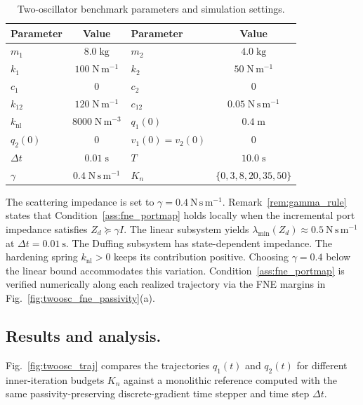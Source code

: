 \begin{table}[!t]
  \caption{Two-oscillator benchmark parameters and simulation settings.}
  \label{tab:twoosc_params}
  \centering
  \renewcommand{\arraystretch}{1.1}
  \begin{tabular}{l c l c}
    \hline
    Parameter & Value & Parameter & Value \\
    \hline
    $m_1$ & $8.0\;\mathrm{kg}$ & $m_2$ & $4.0\;\mathrm{kg}$ \\
    $k_1$ & $100\;\mathrm{N\,m^{-1}}$ & $k_2$ & $50\;\mathrm{N\,m^{-1}}$ \\
    $c_1$ & $0$ & $c_2$ & $0$ \\
    $k_{12}$ & $120\;\mathrm{N\,m^{-1}}$ & $c_{12}$ & $0.05\;\mathrm{N\,s\,m^{-1}}$ \\
    $k_{\mathrm{nl}}$ & $8000\;\mathrm{N\,m^{-3}}$ & $q_1(0)$ & $0.4\;\mathrm{m}$ \\
    $q_2(0)$ & $0$ & $v_1(0)=v_2(0)$ & $0$ \\
    $\Delta t$ & $0.01\;\mathrm{s}$ & $T$ & $10.0\;\mathrm{s}$ \\
    $\gamma$ & $0.4\;\mathrm{N\,s\,m^{-1}}$ & $K_n$ & $\{0,3,8,20,35,50\}$ \\
    \hline
  \end{tabular}
\end{table}

The scattering impedance is set to $\gamma = 0.4\ \mathrm{N\,s\,m^{-1}}$. Remark~\ref{rem:gamma_rule} states that Condition~\ref{ass:fne_portmap} holds locally when the incremental port impedance satisfies $Z_d \succeq \gamma I$. The linear subsystem yields $\lambda_{\min}(Z_d) \approx 0.5\ \mathrm{N\,s\,m^{-1}}$ at $\Delta t = 0.01\ \mathrm{s}$. The Duffing subsystem has state-dependent impedance. The hardening spring $k_{\mathrm{nl}}>0$ keeps its contribution positive. Choosing $\gamma = 0.4$ below the linear bound accommodates this variation. Condition~\ref{ass:fne_portmap} is verified numerically along each realized trajectory via the FNE margins in Fig.~\ref{fig:twoosc_fne_passivity}(a).

\subsection{Results and analysis.}
Fig.~\ref{fig:twoosc_traj} compares the trajectories $q_1(t)$ and $q_2(t)$ for different inner-iteration budgets $K_n$ against a monolithic reference computed with the same passivity-preserving discrete-gradient time stepper and time step $\Delta t$.

